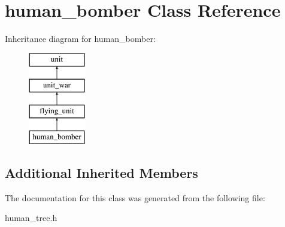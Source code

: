 \hypertarget{classhuman__bomber}{}\section{human\+\_\+bomber Class Reference}
\label{classhuman__bomber}
Inheritance diagram for human\+\_\+bomber\+:\begin{figure}[H]
\begin{center}
\leavevmode
\includegraphics[height=4.000000cm]{classhuman__bomber}
\end{center}
\end{figure}
\subsection*{Additional Inherited Members}


The documentation for this class was generated from the following file\+:\begin{DoxyCompactItemize}
\item 
human\+\_\+tree.\+h\end{DoxyCompactItemize}
